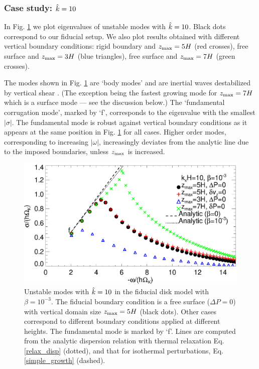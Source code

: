 \subsubsection{Case study: $\hat{k}=10$}
In Fig. \ref{compare_modes_iso_kx10} we plot eigenvalues of unstable 
modes with $\hat{k}=10$. Black dots correspond to our fiducial setup.  
We also plot results obtained with different 
vertical boundary conditions: rigid boundary and $z_\mathrm{max}=5H$ (red
crosses),  free surface and $z_\mathrm{max} = 3H$ (blue triangles), free surface
and $z_\mathrm{max}=7H$ (green crosses). 

The modes shown in Fig. \ref{compare_modes_iso_kx10} are `body modes'
and are inertial waves destabilized by vertical shear
. (The exception being the fastest growing
mode for $z_\mathrm{max}=7H$ which is a surface mode --- see the discussion
below.)  The `fundamental corrugation mode', marked by `f',
corresponds to the eigenvalue with the smallest $|\sigma|$. The
fundamental mode is robust  
against vertical boundary conditions as it appears at the same
position in Fig. \ref{compare_modes_iso_kx10} for all cases. Higher  
order modes, corresponding to increasing $|\omega|$, increasingly
deviates from the analytic line due to the imposed boundaries, 
unless $z_\mathrm{max}$ is increased. 

\begin{figure}
  \includegraphics[width=\linewidth]{figures/compare_modes_iso_kx10_analytic.ps}
  \caption{Unstable modes with $\hat{k}=10$ in the fiducial disk model
    with $\beta=10^{-3}$. %
    The fiducial boundary condition is a free surface ($\Delta P=0$)
    with vertical domain size $z_\mathrm{max}=5H$  (black dots).  Other
    cases correspond to different boundary conditions applied at
    different heights. The fundamental mode is marked by `f'. Lines
    are computed from the analytic dispersion relation 
    with thermal relaxation Eq. \ref{relax_disp} (dotted), and that for
    isothermal perturbations, Eq. \ref{simple_growth} (dashed). 
    \label{compare_modes_iso_kx10} 
  }
\end{figure}

